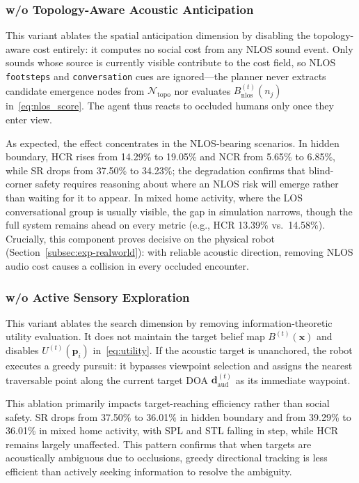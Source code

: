 \subsubsection{w/o Topology-Aware Acoustic Anticipation}
This variant ablates the spatial anticipation dimension by disabling the topology-aware cost entirely: it computes no social cost from any NLOS sound event. Only sounds whose source is currently visible contribute to the cost field, so NLOS \texttt{footsteps} and \texttt{conversation} cues are ignored---the planner never extracts candidate emergence nodes from $\mathcal{N}_{\mathrm{topo}}$ nor evaluates $B_{\mathrm{nlos}}^{(t)}(n_j)$ in~\eqref{eq:nlos_score}. The agent thus reacts to occluded humans only once they enter view.

As expected, the effect concentrates in the NLOS-bearing scenarios. In hidden boundary, HCR rises from 14.29\% to 19.05\% and NCR from 5.65\% to 6.85\%, while SR drops from 37.50\% to 34.23\%; the degradation confirms that blind-corner safety requires reasoning about where an NLOS risk will emerge rather than waiting for it to appear. In mixed home activity, where the LOS conversational group is usually visible, the gap in simulation narrows, though the full system remains ahead on every metric (e.g., HCR 13.39\% vs.\ 14.58\%). Crucially, this component proves decisive on the physical robot (Section~\ref{subsec:exp-realworld}): with reliable acoustic direction, removing NLOS audio cost causes a collision in every occluded encounter.

\subsubsection{w/o Active Sensory Exploration}
This variant ablates the search dimension by removing information-theoretic utility evaluation. It does not maintain the target belief map $B^{(t)}(\mathbf{x})$ and disables $U^{(t)}(\mathbf{p}_i)$ in~\eqref{eq:utility}. If the acoustic target is unanchored, the robot executes a greedy pursuit: it bypasses viewpoint selection and assigns the nearest traversable point along the current target DOA $\mathbf{d}_{\mathrm{aud}}^{(t)}$ as its immediate waypoint.

This ablation primarily impacts target-reaching efficiency rather than social safety. SR drops from 37.50\% to 36.01\% in hidden boundary and from 39.29\% to 36.01\% in mixed home activity, with SPL and STL falling in step, while HCR remains largely unaffected. This pattern confirms that when targets are acoustically ambiguous due to occlusions, greedy directional tracking is less efficient than actively seeking information to resolve the ambiguity.

